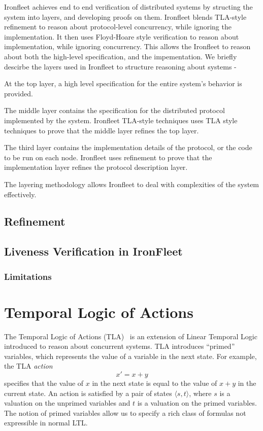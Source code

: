 \documentclass{llncs}
\begin{document}
Ironfleet achieves end to end verification of distributed systems by structing the system into layers, and 
developing proofs on them. Ironfleet blends TLA-style refinement to reason about protocol-level concurrency, 
while ignoring the implementation. It then uses Floyd-Hoare style verification to reason about implementation,
while ignoring concurrency. This allows the Ironfleet to reason about both the high-level specification, and
the impementation. We briefly descirbe the layers used in Ironfleet to structure reasoning about systems - 
\begin{\itemize}
\item At the top layer, a high level specification for the entire system's behavior is provided. 
\item The middle layer contains the specification for the distributed protocol implemented by the
    system. Ironfleet TLA-style techniques uses TLA style techniques to prove that the middle layer 
    refines the top layer.
\item The third layer contains the implementation details of the protocol, or the code to be run on each node.
    Ironfleet uses refinement to prove that the implementation layer refines the protocol description layer. 
\end{\itemize}

The layering methodology allows Ironfleet to deal with complexities of the system effectively. 


\subsection{Refinement}
\subsection{Liveness Verification in IronFleet}\label{sec:liveness-ironfleet}
\subsubsection{Limitations}
%
\section{Temporal Logic of Actions}
The Temporal Logic of Actions (TLA)~\cite{tla-lamport} is an extension of Linear Temporal
Logic introduced to reason about concurrent systems. TLA introduces ``primed''
variables, which represents the value of a variable in the next state. For
example, the TLA \textit{action} $$x' = x + y$$ specifies that the value of $x$
in the next state is equal to the value of $x + y$ in the current state. An
action is satisfied by a pair of states $\langle s, t \rangle$, where $s$ is a
valuation on the unprimed variables and $t$ is a valuation on the primed
variables. The notion of primed variables allow us to specify a rich class of
formulas not expressible in normal LTL.
\end{document}
